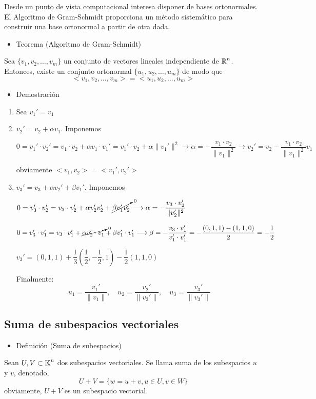 Desde un punto de vista computacional interesa disponer de bases ortonormales. El Algoritmo de Gram-Schmidt proporciona un método sistemático para construir una base ortonormal a partir de otra dada.
\begin{itemize}[label=\color{red}\textbullet, leftmargin=*]
	\item \color{lightblue}Teorema (Algoritmo de Gram-Schmidt)
\end{itemize}
Sea $\{v_1,v_2,\dots,v_m\}$ un conjunto de vectores lineales independiente de $\operatorname{\mathbb{R}}^n$. Entonces, existe un conjunto ortonormal $\{u_1,u_2,\dots,u_m\}$ de modo que \[ <v_1,v_2,\dots,v_m>=<u_1,u_2,\dots,u_m> \]
\begin{itemize}[label=\color{red}\textbullet, leftmargin=*]
	\item \color{lightblue}Demostración
\end{itemize}
\begin{enumerate}[label=\color{lightblue}\arabic*)]
	\item Sea $v_1'=v_1$
	\item $v_2'=v_2+\alpha v_1$. Imponemos 
	
	$0=v_1'\cdot v_2'=v_1\cdot v_2+\alpha v_1\cdot v_1'=v_1'\cdot v_2+\alpha\|v_1'\|^2\longrightarrow\alpha=-\dfrac{v_1\cdot v_2}{\|v_1\|^2}\longrightarrow v_2'=v_2-\dfrac{v_1\cdot v_2}{\|v_1\|^2}v_1$
	
	obviamente $<v_1,v_2>=<v_1',v_2'>$
	\item $v_3'=v_3+\alpha v_2'+\beta v_1'$. Imponemos
	
	$0=v_3'\cdot v_2'=v_3\cdot v_2'+\alpha v_2'v_2'+\cancelto{0}{\beta v_1'v_2'}\longrightarrow\alpha=-\dfrac{v_3\cdot v_2'}{\|v_2'\|^2}$
	
	$0=v_3'\cdot v_1'=v_3\cdot v_1'+\cancelto{0}{\alpha v_2'\cdot v_1'}+\beta v_1'\cdot v_1'\longrightarrow\beta=-\dfrac{v_3\cdot v_1'}{v_1'\cdot v_1'}=-\dfrac{(0,1,1)-(1,1,0)}{2}=-\dfrac{1}{2}$
	
	$v_3'=(0,1,1)+\dfrac{1}{3}\left(\dfrac{1}{2},-\dfrac{1}{2},1\right)-\dfrac{1}{2}(1,1,0)$
	
	Finalmente: \[ u_1=\dfrac{v_1'}{\|v_1\|},\quad u_2=\dfrac{v_2'}{\|v_2'\|},\quad u_3=\dfrac{v_3'}{\|v_3'\|} \]
\end{enumerate}
\subsection{Suma de subespacios vectoriales}
\begin{itemize}[label=\color{red}\textbullet, leftmargin=*]
	\item \color{lightblue}Definición (Suma de subespacios)
\end{itemize}
Sean $U,V\subset\operatorname{\mathbb{K}}^n$ dos subespacios vectoriales. Se llama suma de los subespacios $u$ y $v$, denotado, \[ U+V=\{w=u+v,u\in U,v\in W\} \]obviamente, $U+V$ es un subespacio vectorial.

